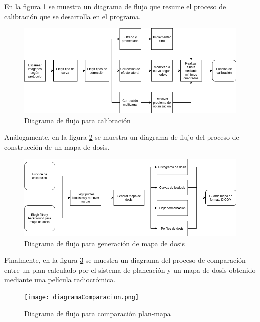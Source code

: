 En la figura \ref{fig:diagramacalibracion} se muestra un diagrama de flujo que resume el proceso de calibración que se desarrolla en el programa.\\
\begin{figure}[H]
	\centering
	\includegraphics[width=\linewidth]{images/daigramaFlujo.png}
	\caption{Diagrama de flujo para calibración }
	\label{fig:diagramacalibracion}
\end{figure}
Análogamente, en la figura \ref{fig:diagramaMapa} se muestra un diagrama de flujo del proceso de construcción de un mapa de dosis.\\
\begin{figure}[H]
	\centering
	\includegraphics[width=\linewidth]{images/daigramaMapaDosis2.png}
	\caption{Diagrama de flujo para generación de mapa de dosis }
	\label{fig:diagramaMapa}
\end{figure}
Finalmente, en la figura \ref{fig:diagramaComparacion} se muestra un diagrama del proceso de comparación entre un plan calculado por el sistema de planeación y un mapa de dosis obtenido mediante una película radiocrómica.
\begin{figure}[H]
	\centering
	\texttt{[image: diagramaComparacion.png]}
	\caption{Diagrama de flujo para comparación plan-mapa }
	\label{fig:diagramaComparacion}
\end{figure}